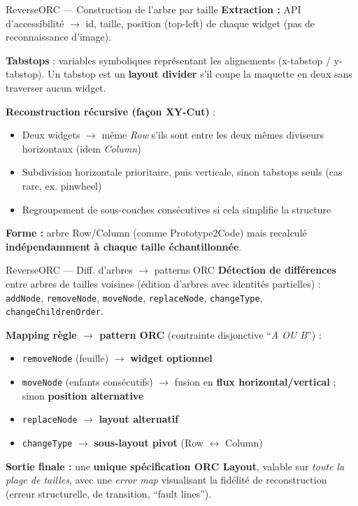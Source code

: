 \documentclass[10pt,aspectratio=169]{beamer}
\begin{document}
\begin{frame}{ReverseORC --- Construction de l'arbre par taille}
\textbf{Extraction :} API d'accessibilité $\to$ id, taille, position (top-left) de chaque widget (pas de reconnaissance d'image).

\textbf{Tabstops} : variables symboliques représentant les alignements (x-tabstop / y-tabstop). Un tabstop est un \textbf{layout divider} s'il coupe la maquette en deux sans traverser aucun widget.

\textbf{Reconstruction récursive (façon XY-Cut)} :
\begin{itemize}
  \item Deux widgets $\to$ même \emph{Row} s'ils sont entre les deux mêmes diviseurs horizontaux (idem \emph{Column})
  \item Subdivision horizontale prioritaire, puis verticale, sinon tabstops seuls (cas rare, ex. pinwheel)
  \item Regroupement de sous-couches consécutives si cela simplifie la structure
\end{itemize}
\textbf{Forme :} arbre Row/Column (comme Prototype2Code) mais recalculé \textbf{indépendamment à chaque taille échantillonnée}.
\end{frame}

\begin{frame}{ReverseORC --- Diff. d'arbres $\to$ patterns ORC}
\textbf{Détection de différences} entre arbres de tailles voisines (édition d'arbres avec identités partielles) : \texttt{addNode}, \texttt{removeNode}, \texttt{moveNode}, \texttt{replaceNode}, \texttt{changeType}, \texttt{changeChildrenOrder}.

\textbf{Mapping règle $\to$ pattern ORC} (contrainte disjonctive ``\emph{A OU B}'') :
\begin{itemize}
  \item \texttt{removeNode} (feuille) $\to$ \textbf{widget optionnel}
  \item \texttt{moveNode} (enfants consécutifs) $\to$ fusion en \textbf{flux horizontal/vertical} ; sinon \textbf{position alternative}
  \item \texttt{replaceNode} $\to$ \textbf{layout alternatif}
  \item \texttt{changeType} $\to$ \textbf{sous-layout pivot} (Row $\leftrightarrow$ Column)
\end{itemize}
\textbf{Sortie finale :} une \textbf{unique spécification ORC Layout}, valable sur \emph{toute la plage de tailles}, avec une \emph{error map} visualisant la fidélité de reconstruction (erreur structurelle, de transition, ``fault lines'').
\end{frame}
\end{document}
